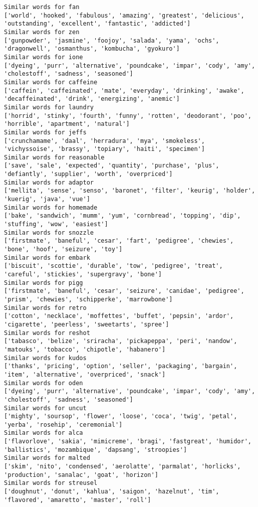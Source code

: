\documentclass[11pt]{article}
\begin{document}
\begin{Verbatim}[commandchars=\\\{\}]
Similar words for fan
['world', 'hooked', 'fabulous', 'amazing', 'greatest', 'delicious', 'outstanding', 'excellent', 'fantastic', 'addicted']
Similar words for zen
['gunpowder', 'jasmine', 'foojoy', 'salada', 'yama', 'ochs', 'dragonwell', 'osmanthus', 'kombucha', 'gyokuro']
Similar words for ione
['dyeing', 'purr', 'alternative', 'poundcake', 'impar', 'cody', 'amy', 'cholestoff', 'sadness', 'seasoned']
Similar words for caffeine
['caffein', 'caffeinated', 'mate', 'everyday', 'drinking', 'awake', 'decaffeinated', 'drink', 'energizing', 'anemic']
Similar words for laundry
['horrid', 'stinky', 'fourth', 'funny', 'rotten', 'deodorant', 'poo', 'horrible', 'apartment', 'natural']
Similar words for jeffs
['crunchamame', 'daal', 'herradura', 'mya', 'smokeless', 'vichyssoise', 'brassy', 'topiary', 'haiti', 'specimen']
Similar words for reasonable
['save', 'sale', 'expected', 'quantity', 'purchase', 'plus', 'defiantly', 'supplier', 'worth', 'overpriced']
Similar words for adaptor
['mellita', 'sense', 'senso', 'baronet', 'filter', 'keurig', 'holder', 'kuerig', 'java', 'vue']
Similar words for homemade
['bake', 'sandwich', 'mumm', 'yum', 'cornbread', 'topping', 'dip', 'stuffing', 'wow', 'easiest']
Similar words for snozzle
['firstmate', 'baneful', 'cesar', 'fart', 'pedigree', 'chewies', 'bone', 'hoof', 'seizure', 'toy']
Similar words for embark
['biscuit', 'scottie', 'durable', 'tow', 'pedigree', 'treat', 'careful', 'stickies', 'supergravy', 'bone']
Similar words for pigg
['firstmate', 'baneful', 'cesar', 'seizure', 'canidae', 'pedigree', 'prism', 'chewies', 'schipperke', 'marrowbone']
Similar words for retro
['cotton', 'necklace', 'moffettes', 'buffet', 'pepsin', 'ardor', 'cigarette', 'peerless', 'sweetarts', 'spree']
Similar words for reshot
['tabasco', 'belize', 'sriracha', 'pickapeppa', 'peri', 'nandow', 'matouks', 'tobacco', 'chipotle', 'habanero']
Similar words for kudos
['thanks', 'pricing', 'option', 'seller', 'packaging', 'bargain', 'item', 'alternative', 'overpriced', 'snack']
Similar words for oden
['dyeing', 'purr', 'alternative', 'poundcake', 'impar', 'cody', 'amy', 'cholestoff', 'sadness', 'seasoned']
Similar words for uncut
['mighty', 'soursop', 'flower', 'loose', 'coca', 'twig', 'petal', 'yerba', 'rosehip', 'ceremonial']
Similar words for alca
['flavorlove', 'sakia', 'mimicreme', 'bragi', 'fastgreat', 'humidor', 'ballistics', 'mozambique', 'dapsang', 'stroopies']
Similar words for malted
['skim', 'nito', 'condensed', 'aerolatte', 'parmalat', 'horlicks', 'production', 'sanalac', 'goat', 'horizon']
Similar words for streusel
['doughnut', 'donut', 'kahlua', 'saigon', 'hazelnut', 'tim', 'flavored', 'amaretto', 'master', 'roll']

\end{Verbatim}
\end{document}
